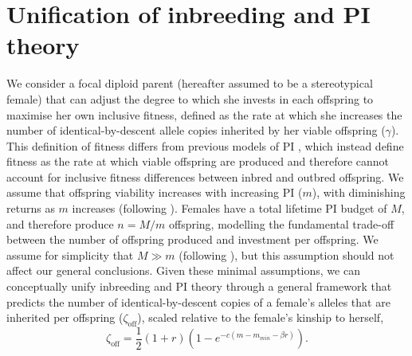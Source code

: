 \documentclass[12pt]{article}
\begin{document}
\section*{Unification of inbreeding and PI theory}

We consider a focal diploid parent (hereafter assumed to be a stereotypical female) that can adjust the degree to which she invests in each offspring to maximise her own inclusive fitness, defined as the rate at which she increases the number of identical-by-descent allele copies inherited by her viable offspring ($\gamma$). This definition of fitness differs from previous models of PI \cite[][]{Macnair1978, Parker1978}, which instead define fitness as the rate at which viable offspring are produced and therefore cannot account for inclusive fitness differences between inbred and outbred offspring. We assume that offspring viability increases with increasing PI ($m$), with diminishing returns as $m$ increases (following \cite[][]{Parker1978}). Females have a total lifetime PI budget of $M$, and therefore produce $n=M/m$ offspring, modelling the fundamental trade-off between the number of offspring produced and investment per offspring. We assume for simplicity that $M \gg m$ (following \cite[][]{Parker1985}), but this assumption should not affect our general conclusions. Given these minimal assumptions, we can conceptually unify inbreeding and PI theory through a general framework that predicts the number of identical-by-descent copies of a female's alleles that are inherited per offspring ($\zeta_{\textrm{off}}$), scaled relative to the female's kinship to herself,
\begin{equation} \label{maineq}
\zeta_{\textrm{off}} = \frac{1}{2}\left(1+r\right)\left(1-e^{-c\left(m-m_{min}-\beta r\right)}\right).
\end{equation}
\end{document}
